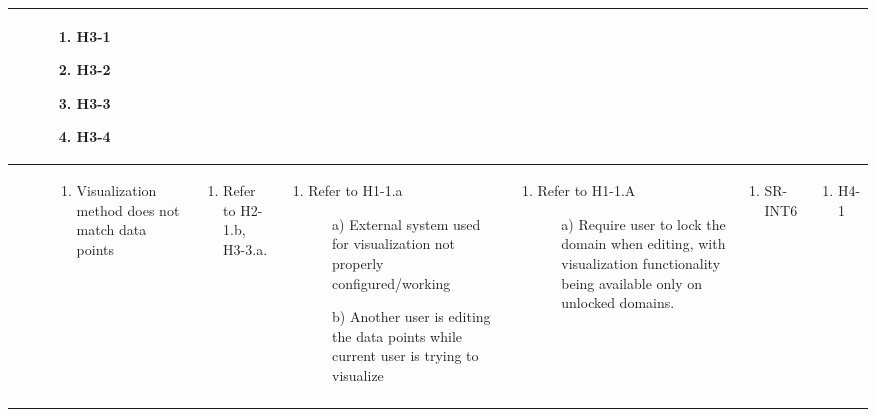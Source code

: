 \documentclass{article}
\begin{document}
\begin{landscape}
\begin{longtable}{|p{2cm}|p{4cm}|p{4cm}|p{4cm}|p{4cm}|p{2cm}|p{2cm}|}
\begin{enumerate}[leftmargin=*]
  \end{enumerate} &
  \begin{enumerate}[leftmargin=*]
    \item H3-1
    \item H3-2
    \item H3-3
    \item H3-4
  \end{enumerate} \\
  \hline
   & 
  \begin{enumerate}[leftmargin=*]
      \item Visualization method does not match data points
  \end{enumerate} & 
  \begin{enumerate}[leftmargin=*]
      \item Refer to H2-1.b, H3-3.a.
  \end{enumerate} &
  \begin{enumerate}[leftmargin=*]
    \item Refer to H1-1.a
    \begin{enumerate}
        \item[a)] External system used for visualization not properly configured/working
        \item[b)] Another user is editing the data points while current user is trying to visualize
    \end{enumerate}
  \end{enumerate} &
  \begin{enumerate}[leftmargin=*]
    \item Refer to H1-1.A
    \begin{enumerate}
        \item[a)] Require user to lock the domain when editing, with visualization functionality being available only on unlocked domains.
    \end{enumerate}
  \end{enumerate} &
  \begin{enumerate}[leftmargin=*]
       \item SR-INT6
  \end{enumerate} &
  \begin{enumerate}[leftmargin=*]
       \item H4-1
  \end{enumerate} \\
  \hline
   & 

\end{longtable}
\end{landscape}
\end{document}
